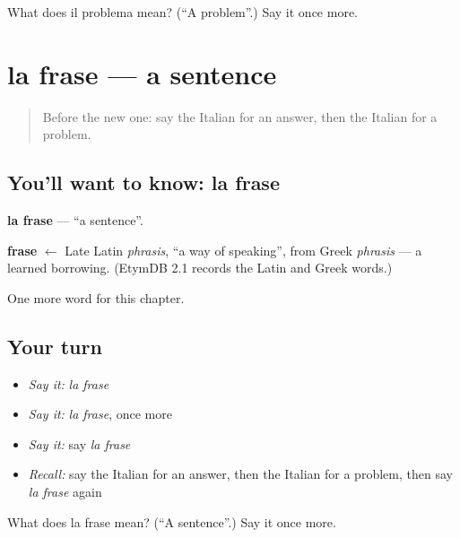 \begin{tcolorbox}[breakable,colback=teal!4,colframe=teal!35!black,title={Before you move on}]
What does il problema mean? (\textquotedblleft{}A problem\textquotedblright{}.) Say it once more.
\end{tcolorbox}
\section[la frase]{la frase — a sentence}

\label{lesson:IT-C115-frase}



\begin{quote}
Before the new one: say the Italian for an answer, then the Italian for a problem.
\end{quote}

\subsection*{You'll want to know: la frase}
\textbf{la frase} — \textquotedblleft{}a sentence\textquotedblright{}.

\begin{cousinweb}
\textbf{frase} $\leftarrow$ Late Latin \emph{phrasis}, \textquotedblleft{}a way of speaking\textquotedblright{}, from Greek \emph{phrasis} — a learned borrowing. (EtymDB 2.1 records the Latin and Greek words.)
\end{cousinweb}

\begin{grammarlens}[title={What you've built}]
One more word for this chapter.
\end{grammarlens}

\subsection*{Your turn}
\begin{itemize}
\raggedright
  \item \emph{Say it:} \emph{la frase}
  \item \emph{Say it:} \emph{la frase}, once more
  \item \emph{Say it:} say \emph{la frase}
  \item \emph{Recall:} say the Italian for an answer, then the Italian for a problem, then say \emph{la frase} again
\end{itemize}

\begin{tcolorbox}[breakable,colback=teal!4,colframe=teal!35!black,title={Before you move on}]
What does la frase mean? (\textquotedblleft{}A sentence\textquotedblright{}.) Say it once more.
\end{tcolorbox}
